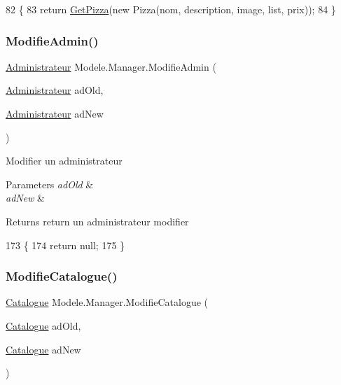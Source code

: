 \begin{DoxyCode}
82         \{
83             \textcolor{keywordflow}{return} \hyperlink{classModele_1_1Manager_a8c2edb35d4e642e0478beda5f7855ca5}{GetPizza}(\textcolor{keyword}{new} Pizza(nom, description, image, list, prix));
84         \}
\end{DoxyCode}
\mbox{\label{classModele_1_1Manager_a155917f6e891c65745f967b80e384141}} 
\subsubsection{\texorpdfstring{Modifie\+Admin()}{ModifieAdmin()}}
{\footnotesize\ttfamily \hyperlink{classModele_1_1Administrateur}{Administrateur} Modele.\+Manager.\+Modifie\+Admin (\begin{DoxyParamCaption}\item[{\hyperlink{classModele_1_1Administrateur}{Administrateur}}]{ad\+Old,  }\item[{\hyperlink{classModele_1_1Administrateur}{Administrateur}}]{ad\+New }\end{DoxyParamCaption})\hspace{0.3cm}{\ttfamily [inline]}}



Modifier un administrateur 


\begin{DoxyParams}{Parameters}
{\em ad\+Old} & \\
\hline
{\em ad\+New} & \\
\hline
\end{DoxyParams}
\begin{DoxyReturn}{Returns}
return un administrateur modifier
\end{DoxyReturn}

\begin{DoxyCode}
173         \{
174             \textcolor{keywordflow}{return} null;
175         \}
\end{DoxyCode}
\mbox{\label{classModele_1_1Manager_a62c5004c6c46fb13f010669ea2e4937a}} 
\subsubsection{\texorpdfstring{Modifie\+Catalogue()}{ModifieCatalogue()}}
{\footnotesize\ttfamily \hyperlink{classModele_1_1Catalogue}{Catalogue} Modele.\+Manager.\+Modifie\+Catalogue (\begin{DoxyParamCaption}\item[{\hyperlink{classModele_1_1Catalogue}{Catalogue}}]{ad\+Old,  }\item[{\hyperlink{classModele_1_1Catalogue}{Catalogue}}]{ad\+New }\end{DoxyParamCaption})\hspace{0.3cm}{\ttfamily [inline]}}



